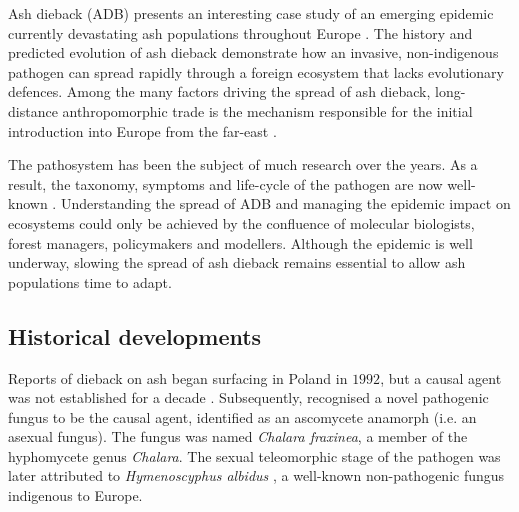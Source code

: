 

\label{ch2:ash-dieback}
Ash dieback (ADB) presents an interesting case study of an emerging epidemic currently devastating ash
populations throughout Europe \cite{enderle2019overview}. The history and predicted evolution of ash dieback
demonstrate how an invasive, non-indigenous pathogen can spread rapidly through a foreign ecosystem that 
lacks evolutionary defences. Among the many factors driving the spread of ash dieback, long-distance 
anthropomorphic trade is the mechanism responsible for the initial introduction into Europe from the
far-east \cite{zhao2013hymenoscyphus, queloz2011cryptic}.

The pathosystem has been the subject of much research over the years. As a result, the taxonomy, 
symptoms and life-cycle of the pathogen are  now well-known \cite{https://doi.org/10.1111/mpp.12073}. 
Understanding the spread of ADB and managing the epidemic impact on ecosystems could only be achieved
by the confluence of molecular biologists, forest managers, policymakers and modellers. Although the epidemic
is well underway, slowing the spread of ash dieback remains essential to allow ash populations time to adapt.

\subsection{Historical developments}

Reports of dieback on ash began surfacing in Poland in $1992$, but a causal agent was not established
for a decade \cite{kowalski2001zamieraniu, coetsee2000xenochalara}. Subsequently, \cite{kowalski2006chalara} 
recognised a novel pathogenic fungus to be the causal agent, identified as an ascomycete anamorph (i.e. an asexual fungus).
The fungus was named \textit{Chalara fraxinea}, a member of the hyphomycete genus \textit{Chalara}. 
The sexual teleomorphic stage of the pathogen was later attributed to \textit{Hymenoscyphus albidus} 
\cite{kowalski2009teleomorph}, a well-known non-pathogenic fungus indigenous to Europe.

